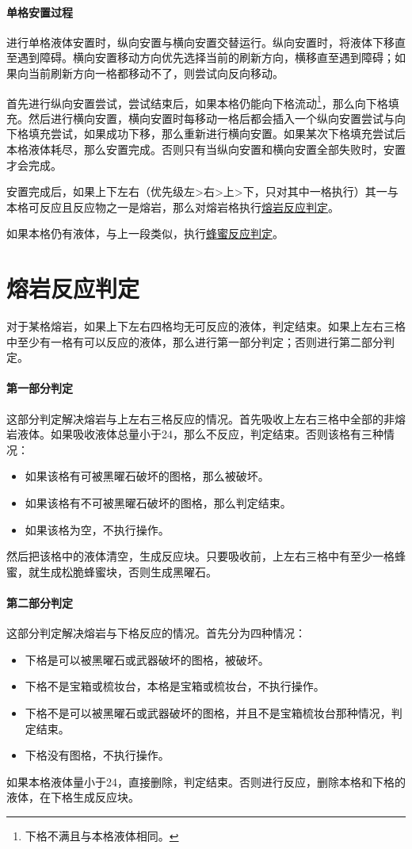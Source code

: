 \paragraph*{单格安置过程}
进行单格液体安置时，纵向安置与横向安置交替运行。纵向安置时，将液体下移直至遇到障碍。横向安置移动方向优先选择当前的刷新方向，横移直至遇到障碍；如果向当前刷新方向一格都移动不了，则尝试向反向移动。

首先进行纵向安置尝试，尝试结束后，如果本格仍能向下格流动\footnote{下格不满且与本格液体相同。}，那么向下格填充。然后进行横向安置，横向安置时每移动一格后都会插入一个纵向安置尝试与向下格填充尝试，如果成功下移，那么重新进行横向安置。如果某次下格填充尝试后本格液体耗尽，那么安置完成。否则只有当纵向安置和横向安置全部失败时，安置才会完成。

安置完成后，如果上下左右（优先级左>右>上>下，只对其中一格执行）其一与本格可反应且反应物之一是熔岩，那么对熔岩格执行\hyperref[app24]{熔岩反应判定}。

如果本格仍有液体，与上一段类似，执行\hyperref[app25]{蜂蜜反应判定}。

\section{熔岩反应判定}\label{app24}
对于某格熔岩，如果上下左右四格均无可反应的液体，判定结束。如果上左右三格中至少有一格有可以反应的液体，那么进行第一部分判定；否则进行第二部分判定。

\paragraph*{第一部分判定}
这部分判定解决熔岩与上左右三格反应的情况。首先吸收上左右三格中全部的非熔岩液体。如果吸收液体总量小于24，那么不反应，判定结束。否则该格有三种情况：
\begin{itemize}
    \item 如果该格有可被黑曜石破坏的图格，那么被破坏。
    \item 如果该格有不可被黑曜石破坏的图格，那么判定结束。
    \item 如果该格为空，不执行操作。
\end{itemize}
然后把该格中的液体清空，生成反应块。只要吸收前，上左右三格中有至少一格蜂蜜，就生成松脆蜂蜜块，否则生成黑曜石。

\paragraph*{第二部分判定}
这部分判定解决熔岩与下格反应的情况。首先分为四种情况：
\begin{itemize}
    \item 下格是可以被黑曜石或武器破坏的图格，被破坏。
    \item 下格不是宝箱或梳妆台，本格是宝箱或梳妆台，不执行操作。
    \item 下格不是可以被黑曜石或武器破坏的图格，并且不是宝箱梳妆台那种情况，判定结束。
    \item 下格没有图格，不执行操作。
\end{itemize}
如果本格液体量小于24，直接删除，判定结束。否则进行反应，删除本格和下格的液体，在下格生成反应块。

